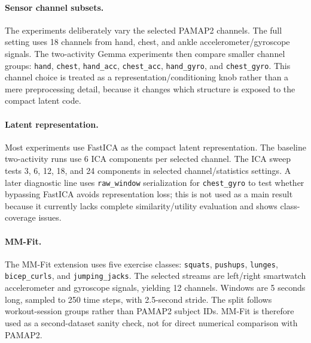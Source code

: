 \paragraph{Sensor channel subsets.}
The experiments deliberately vary the selected PAMAP2 channels. The full
setting uses 18 channels from hand, chest, and ankle accelerometer/gyroscope
signals. The two-activity Gemma experiments then compare smaller channel groups:
\texttt{hand}, \texttt{chest}, \texttt{hand\_acc}, \texttt{chest\_acc},
\texttt{hand\_gyro}, and \texttt{chest\_gyro}. This channel choice is treated as
a representation/conditioning knob rather than a mere preprocessing detail,
because it changes which structure is exposed to the compact latent code.

\paragraph{Latent representation.}
Most experiments use FastICA as the compact latent representation. The baseline
two-activity runs use 6 ICA components per selected channel. The ICA sweep tests
3, 6, 12, 18, and 24 components in selected channel/statistics settings. A
later diagnostic line uses \texttt{raw\_window} serialization for
\texttt{chest\_gyro} to test whether bypassing FastICA avoids representation
loss; this is not used as a main result because it currently lacks complete
similarity/utility evaluation and shows class-coverage issues.

\paragraph{MM-Fit.}
The MM-Fit extension uses five exercise classes: \texttt{squats},
\texttt{pushups}, \texttt{lunges}, \texttt{bicep\_curls}, and
\texttt{jumping\_jacks}. The selected streams are left/right smartwatch
accelerometer and gyroscope signals, yielding 12 channels. Windows are 5 seconds
long, sampled to 250 time steps, with 2.5-second stride. The split follows
workout-session groups rather than PAMAP2 subject IDs. MM-Fit is therefore used
as a second-dataset sanity check, not for direct numerical comparison with
PAMAP2.

